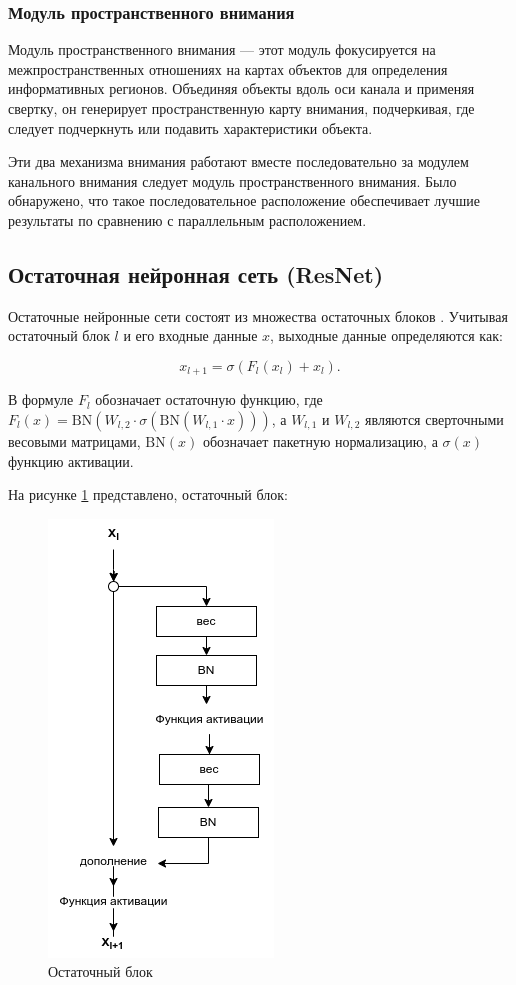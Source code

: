\subsubsection*{Модуль пространственного внимания}

Модуль пространственного внимания --- этот модуль фокусируется на межпространственных отношениях на картах объектов для определения информативных регионов. Объединяя объекты вдоль оси канала и применяя свертку, он генерирует пространственную карту внимания, подчеркивая, где следует подчеркнуть или подавить характеристики объекта.

Эти два механизма внимания работают вместе последовательно за модулем канального внимания следует модуль пространственного внимания. Было обнаружено, что такое последовательное расположение обеспечивает лучшие результаты по сравнению с параллельным расположением.

\subsection{Остаточная нейронная сеть (ResNet)}

Остаточные нейронные сети состоят из множества остаточных блоков \cite{he2016deep}. Учитывая остаточный блок \(l\) и его входные данные \(x\), выходные данные определяются как:

\begin{equation}
    x_{l + 1} = \sigma(F_{l}(x_{l}) + x_{l}).
\end{equation}

В формуле \(F_{l}\) обозначает остаточную функцию, где \(F_{l}(x) = \text{BN}(W_{l,2} \cdot \sigma(\text{BN}(W_{l,1} \cdot x)))\), а \(W_{l,1}\) и \(W_{l,2}\) являются сверточными весовыми матрицами, \(\text{BN}(x)\) обозначает пакетную нормализацию, а \(\sigma(x)\) функцию активации.

На рисунке \ref{fig:residual-block} представлено, остаточный блок:
\begin{figure}[H]
	\centering
	\includegraphics[width=0.3\linewidth]{assets/residual-block.png}
	\caption{Остаточный блок}
	\label{fig:residual-block}
\end{figure}

